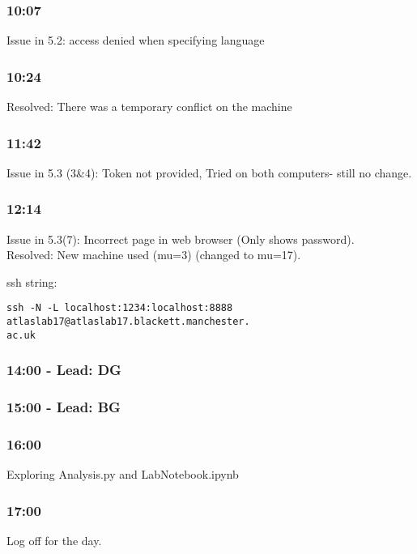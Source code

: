 \subsubsection*{\textbf{10:07}}
Issue in 5.2: access denied when specifying language

\subsubsection*{\textbf{10:24}}
Resolved: There was a temporary conflict on the machine

\subsubsection*{\textbf{11:42}}
Issue in 5.3 (3\&4): Token not provided, Tried on both computers- still no change.

\subsubsection*{\textbf{12:14}}
Issue in 5.3(7): Incorrect page in web browser (Only shows password).
\\
Resolved: New machine used (mu=3) (changed to mu=17).

ssh string:
\begin{lstlisting}
ssh -N -L localhost:1234:localhost:8888 atlaslab17@atlaslab17.blackett.manchester.
ac.uk
\end{lstlisting}

\subsubsection*{\textbf{14:00} - Lead: DG}

\subsubsection*{\textbf{15:00} - Lead: BG}

\subsubsection*{\textbf{16:00}}
Exploring Analysis.py and LabNotebook.ipynb

\subsubsection*{\textbf{17:00}}
Log off for the day.